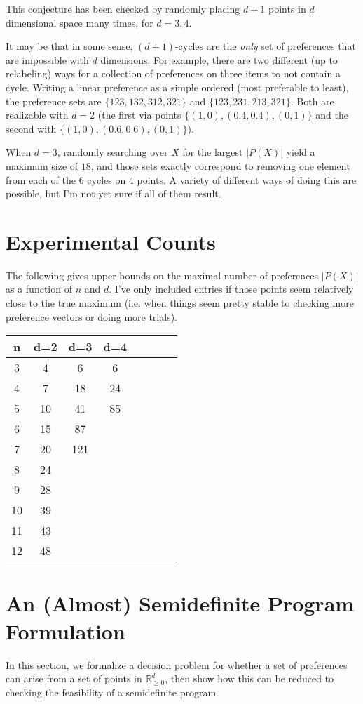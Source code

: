 \documentclass[12pt]{article}
\newcommand{\Rgz}{\mathbb{R}_{\ge 0}}
\newcommand{\1}[1]{\mathds{1}[{#1}]}
\begin{document}
  This conjecture has been checked by randomly placing $d+1$ points 
  in $d$ dimensional space many times, for $d=3,4$.

  It may be that in some sense, $(d+1)$-cycles are the \emph{only}
  set of preferences that are impossible with $d$ dimensions.
  For example, there are two different (up to relabeling) ways for
  a collection of preferences on three items to not contain a cycle.
  Writing a linear preference as a simple ordered (most preferable
  to least), the preference sets are $\{ 123, 132, 312, 321\}$ and
  $\{ 123, 231, 213, 321 \}$. Both are realizable with $d=2$
  (the first via points $\{(1,0), (0.4,0.4), (0,1) \}$
  and the second with $\{(1,0), (0.6,0.6), (0,1)\}$).

  When $d=3$, randomly searching over $X$ for the largest $|P(X)|$
  yield a maximum size of $18$, and those sets exactly correspond
  to removing one element from each of the $6$ cycles on $4$ points.
  A variety of different ways of doing this are possible,  but I'm
  not yet sure if all of them result.

\section{Experimental Counts}
  The following gives upper bounds on the maximal number
  of preferences $|P(X)|$ as a function of $n$ and $d$.
  I've only included entries if those points seem relatively
  close to the true maximum (i.e. when things seem pretty stable
  to checking more preference vectors or doing more trials).

  \begin{tabular}{c | c c c c c c c}
    n & d=2 & d=3 & d=4 \\
    \hline
    3  &  4   & 6  & 6  \\
    4  &  7   & 18 & 24 \\
    5  &  10  & 41 & 85 \\
    6  &  15  & 87  \\
    7  &  20  & 121 \\
    8  &  24  \\
    9  &  28  \\
    10 &  39  \\
    11 &  43  \\
    12 &  48  \\
  \end{tabular}

\section{An (Almost) Semidefinite Program Formulation}
  In this section, we formalize a decision problem for whether a set
  of preferences can arise from a set of points in $\Rgz^d$,
  then show how this can be reduced to checking the feasibility
  of a semidefinite program.
\end{document}
